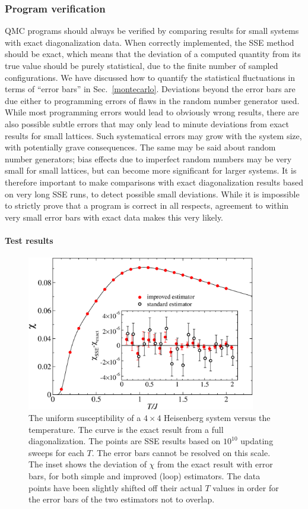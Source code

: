 \documentclass[draft,numberedheadings]{aipproc}
\begin{document}
\subsubsection{Program verification}

QMC programs should always be verified by comparing results for small systems with exact diagonalization data. When correctly implemented,
the SSE method should be exact, which means that the deviation of a computed quantity from its true value should be purely statistical, due to the 
finite number of sampled configurations. We have discussed how to quantify the statistical fluctuations in terms of ``error bars'' in Sec.~\ref{montecarlo}. 
Deviations beyond the error bars are due either to programming errors of flaws in the random number generator used. While most programming errors would lead to 
obviously wrong results, there are also possible subtle errors that may only lead to minute deviations from exact results for small lattices. Such systematical 
errors may grow with the system size, with potentially grave consequences. The same may be said about random number generators; bias effects due to imperfect random 
numbers may be very small for small lattices, but can become more significant for larger systems. It is therefore important to make comparisons with 
exact diagonalization results based on very long SSE runs, to detect possible small deviations. While it is impossible to strictly prove that a program is correct 
in all respects, agreement to within very small error bars with exact data makes this very likely.

\paragraph{Test results}

\begin{figure}
\includegraphics[width=10cm, clip]{l4comp.eps}
\caption{The uniform susceptibility of a $4\times 4$ Heisenberg system versus the temperature. The curve is the exact result from a full diagonalization.
The points are SSE results based on $10^{10}$ updating sweeps for each $T$. The error bars cannot be resolved on this scale. The inset shows the deviation
of $\chi$ from the exact result with error bars, for both simple and improved (loop) estimators. The data points have been slightly shifted off their actual 
$T$ values in order for the error bars of the two estimators not to overlap.}
\label{l4comp}
\end{figure}
\end{document}
